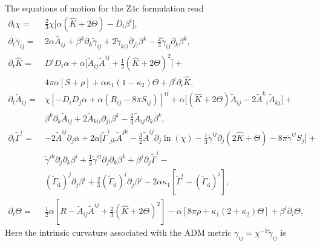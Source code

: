 The equations of motion for the Z4c formulation read
%
\begin{equation}
\begin{aligned}
    \partial_t\chi =& \frac{2}{3}\chi \Big[ \alpha (\hat{K} + 2\Theta) - D_i\beta^i \Big], \\
    \partial_t\bar{\gamma}_{ij} =& 2\alpha\bar{A}_{ij} + \beta^k\partial_k\widetilde{\gamma}_{ij} + 
    2\widetilde{\gamma}_{k(i}\partial_{j)}\beta^k - \frac{2}{3}\widetilde{\gamma}_{ij}\partial_k\beta^k, \\
    \partial_t\hat{K} =& D^{i}D_{i}\alpha + \alpha \Big[ \widetilde{A}_{ij}\widetilde{A}^{ij} + \frac{1}{3}(\hat{K} + 2\Theta)^2 \Big] +  \\
    & 4\pi \alpha [S + \rho] + \alpha \kappa_1 (1 - \kappa_2)\Theta + \beta^i\partial_i\hat{K},  \\
    \partial_t\widetilde{A}_{ij} =& \chi [ -D_i D_j \alpha + \alpha(R_{ij} - 8\pi S_{ij}) ]^{\text{tf}} + 
    \alpha \Big[ (\hat{K} + 2\Theta)\widetilde{A}_{ij} - 2 {\widetilde{A}^k}_i\widetilde{A}_{kj} \Big] + \\
    & \beta^k\partial_k\widetilde{A}_{ij} + 2\widetilde{A}_{k(i}\partial_{j)}\beta^k - \frac{2}{3}\widetilde{A}_{ij}\partial_{k}\beta^{k},  \\
    \partial_t\widetilde{\Gamma}^i =& -2\widetilde{A}^{ij}\partial_j\alpha + 2\alpha\Big[ {\widetilde{\Gamma}^i}_{jk}\widetilde{A}^{jk} - 
    \frac{3}{2}\widetilde{A}^{ij}\partial_j\ln(\chi) - \frac{1}{3}\widetilde{\gamma}^{ij}\partial_j(2\hat{K}+\Theta) - 8\pi\widetilde{\gamma}^{ij}S_j \Big] + \\
    & \widetilde{\gamma}^{jk}\partial_j\partial_k\beta^i + \frac{1}{3}\widetilde{\gamma}^{ij}\partial_j\partial_k\beta^k + \beta^j\partial_j\widetilde{\Gamma}^i - \\
    & (\widetilde{\Gamma}_{\text{d}})^j\partial_j\beta^i + \frac{2}{3}(\widetilde{\Gamma}_{\text{d}})^i\partial_j\beta^j - 
    2\alpha\kappa_1 [ \widetilde{\Gamma}^i - (\widetilde{\Gamma}_{\text{d}})^i ], \\
    \partial_t\Theta =& \frac{1}{2}\alpha [R - \widetilde{A}_{ij}\widetilde{A}^{ij} + \frac{2}{3}(\hat{K} + 2\Theta)^2] - 
    \alpha [ 8\pi\rho + \kappa_1(2+\kappa_2)\Theta ] + \beta^i\partial_i\Theta, 
\end{aligned}
\label{eq:theory:z4c_equations} %
\end{equation}
%
Here the intrinsic curvature associated with the \ac{ADM} metric $\gamma_{ij} = \chi^{-1}\widetilde{\gamma}_{ij}$ is 
